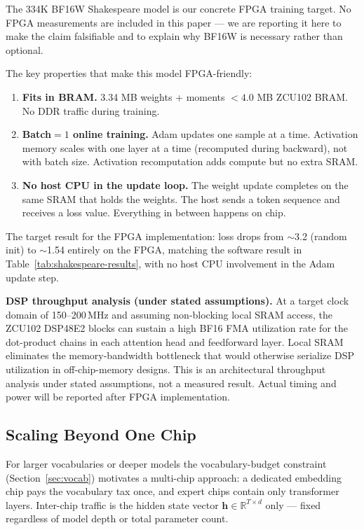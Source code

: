 \documentclass[11pt]{article}
\begin{document}
The 334K BF16W Shakespeare model is our concrete FPGA training target. No FPGA
measurements are included in this paper --- we are reporting it here to make the
claim falsifiable and to explain why BF16W is necessary rather than optional.

The key properties that make this model FPGA-friendly:

\begin{enumerate}
  \item \textbf{Fits in BRAM.} 3.34 MB weights + moments $< 4.0$ MB ZCU102 BRAM.
    No DDR traffic during training.
  \item \textbf{Batch$=1$ online training.} Adam updates one sample at a time.
    Activation memory scales with one layer at a time (recomputed during backward),
    not with batch size. Activation recomputation adds compute but no extra SRAM.
  \item \textbf{No host CPU in the update loop.} The weight update completes on the
    same SRAM that holds the weights. The host sends a token sequence and receives
    a loss value. Everything in between happens on chip.
\end{enumerate}

The target result for the FPGA implementation: loss drops from $\sim$3.2 (random init) to $\sim$1.54
entirely on the FPGA, matching the software result in Table~\ref{tab:shakespeare-results},
with no host CPU involvement in the Adam update step.

\textbf{DSP throughput analysis (under stated assumptions).}
At a target clock domain of 150--200\,MHz and assuming non-blocking local SRAM access,
the ZCU102 DSP48E2 blocks can sustain a high BF16 FMA utilization rate for the
dot-product chains in each attention head and feedforward layer.
Local SRAM eliminates the memory-bandwidth bottleneck that would otherwise serialize
DSP utilization in off-chip-memory designs.
This is an architectural throughput analysis under stated assumptions, not a measured result.
Actual timing and power will be reported after FPGA implementation.

\subsection{Scaling Beyond One Chip}

For larger vocabularies or deeper models the vocabulary-budget constraint
(Section~\ref{sec:vocab}) motivates a multi-chip approach: a dedicated embedding chip
pays the vocabulary tax once, and expert chips contain only transformer layers.
Inter-chip traffic is the hidden state vector $\mathbf{h} \in \mathbb{R}^{T \times d}$
only --- fixed regardless of model depth or total parameter count.
\end{document}

